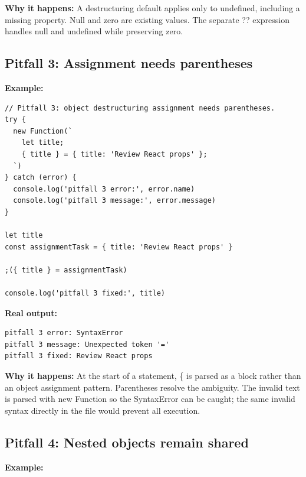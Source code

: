 \documentclass[10pt,a4paper]{article}
\begin{document}
\textbf{Why it happens:} A destructuring default applies only to undefined, including a missing property. Null and zero are existing values. The separate ?? expression handles null and undefined while preserving zero.

\subsection{Pitfall 3: Assignment needs parentheses}


\textbf{Example:}

\begin{lstlisting}[language=GuideJS]
// Pitfall 3: object destructuring assignment needs parentheses.
try {
  new Function(`
    let title;
    { title } = { title: 'Review React props' };
  `)
} catch (error) {
  console.log('pitfall 3 error:', error.name)
  console.log('pitfall 3 message:', error.message)
}

let title
const assignmentTask = { title: 'Review React props' }

;({ title } = assignmentTask)

console.log('pitfall 3 fixed:', title)
\end{lstlisting}


\textbf{Real output:}

\begin{lstlisting}[language={}]
pitfall 3 error: SyntaxError
pitfall 3 message: Unexpected token '='
pitfall 3 fixed: Review React props
\end{lstlisting}

\textbf{Why it happens:} At the start of a statement, \{ is parsed as a block rather than an object assignment pattern. Parentheses resolve the ambiguity. The invalid text is parsed with new Function so the SyntaxError can be caught; the same invalid syntax directly in the file would prevent all execution.

\subsection{Pitfall 4: Nested objects remain shared}


\textbf{Example:}
\end{document}

